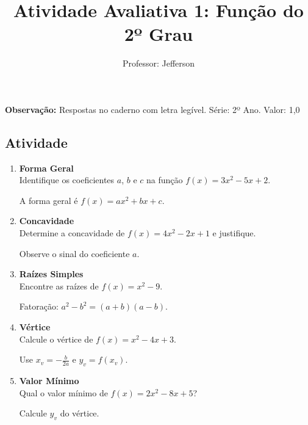 \documentclass[11pt]{article}
\title{\textcolor{titleblue}{Atividade Avaliativa 1: Função do 2º Grau}}
\author{Professor: Jefferson}
\date{}
\begin{document}
\maketitle
\vspace{-1cm}

\begin{center}
    \large{\textbf{Observação:} Respostas no caderno com letra legível. \quad Série: 2º Ano. Valor: 1,0}
\end{center}

\begin{multicols}{2}

\section*{Atividade}
\begin{enumerate}

\item \textbf{Forma Geral}\\
Identifique os coeficientes $a$, $b$ e $c$ na função $f(x) = 3x^2 - 5x + 2$.
\begin{tcolorbox}[colback=explanationbg,colframe=titleblue,title=Dica:]
A forma geral é $f(x) = ax^2 + bx + c$.
\end{tcolorbox}

\item \textbf{Concavidade}\\
Determine a concavidade de $f(x) = 4x^2 - 2x + 1$ e justifique.
\begin{tcolorbox}[colback=explanationbg,colframe=titleblue,title=Dica:]
Observe o sinal do coeficiente $a$.
\end{tcolorbox}

\item \textbf{Raízes Simples}\\
Encontre as raízes de $f(x) = x^2 - 9$.
\begin{tcolorbox}[colback=explanationbg,colframe=titleblue,title=Dica:]
Fatoração: $a^2 - b^2 = (a+b)(a-b)$.
\end{tcolorbox}

\item \textbf{Vértice}\\
Calcule o vértice de $f(x) = x^2 - 4x + 3$.
\begin{tcolorbox}[colback=explanationbg,colframe=titleblue,title=Dica:]
Use $x_v = -\frac{b}{2a}$ e $y_v = f(x_v)$.
\end{tcolorbox}

\item \textbf{Valor Mínimo}\\
Qual o valor mínimo de $f(x) = 2x^2 - 8x + 5$?
\begin{tcolorbox}[colback=explanationbg,colframe=titleblue,title=Dica:]
Calcule $y_v$ do vértice.
\end{tcolorbox}


\end{enumerate}
\end{multicols}
\end{document}

